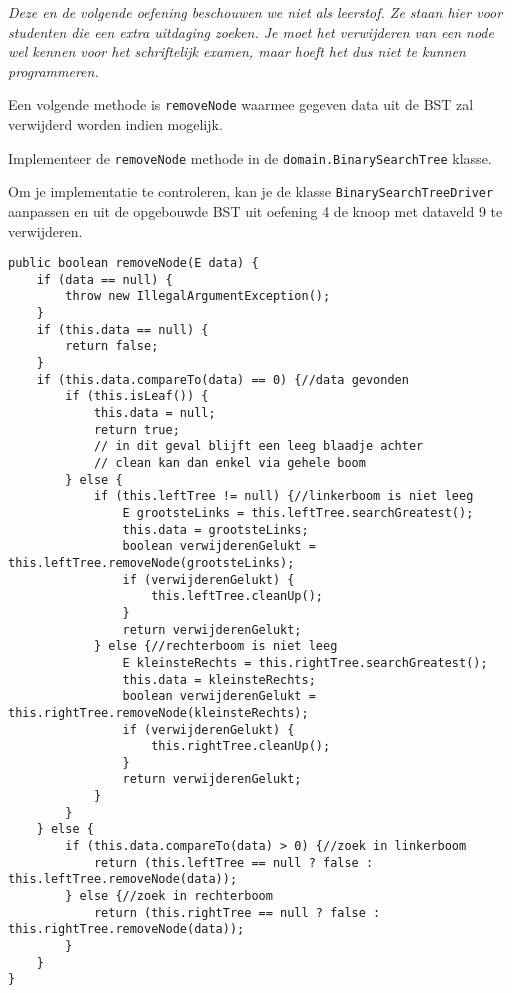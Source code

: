 \begin{oef}
\code \emph{Deze en de volgende oefening beschouwen we niet als leerstof. Ze staan hier voor studenten die een extra uitdaging zoeken. Je moet het verwijderen van een node wel kennen voor het schriftelijk examen, maar hoeft het dus niet te kunnen programmeren.}

Een volgende methode is \verb=removeNode= waarmee gegeven data uit de BST zal verwijderd worden indien mogelijk. 
\begin{oefenumerate}
\item Implementeer de \verb=removeNode= methode in de \verb=domain.BinarySearchTree= klasse.
\item Om je implementatie te controleren, kan je de klasse  \verb=BinarySearchTreeDriver= aanpassen en uit de opgebouwde BST uit oefening 4 de knoop met dataveld 9 te verwijderen.

	
	
\end{oefenumerate}
\begin{opl}
\begin{lstlisting}[caption={removeNode methode}, label=bstremovenode]
public boolean removeNode(E data) {
	if (data == null) {
		throw new IllegalArgumentException();
	}
	if (this.data == null) {
		return false;
	}
	if (this.data.compareTo(data) == 0) {//data gevonden
		if (this.isLeaf()) {
			this.data = null;
			return true;
			// in dit geval blijft een leeg blaadje achter
			// clean kan dan enkel via gehele boom
		} else {
			if (this.leftTree != null) {//linkerboom is niet leeg
				E grootsteLinks = this.leftTree.searchGreatest();
				this.data = grootsteLinks;
				boolean verwijderenGelukt = this.leftTree.removeNode(grootsteLinks);
				if (verwijderenGelukt) {
					this.leftTree.cleanUp();
				}
				return verwijderenGelukt;
			} else {//rechterboom is niet leeg
				E kleinsteRechts = this.rightTree.searchGreatest();
				this.data = kleinsteRechts;
				boolean verwijderenGelukt = this.rightTree.removeNode(kleinsteRechts);
				if (verwijderenGelukt) {
					this.rightTree.cleanUp();
				}
				return verwijderenGelukt;
			}
		}
	} else {
		if (this.data.compareTo(data) > 0) {//zoek in linkerboom
			return (this.leftTree == null ? false : this.leftTree.removeNode(data));
		} else {//zoek in rechterboom
			return (this.rightTree == null ? false : this.rightTree.removeNode(data));
		}
	}
}
\end{lstlisting}


\end{opl}
\end{oef}
